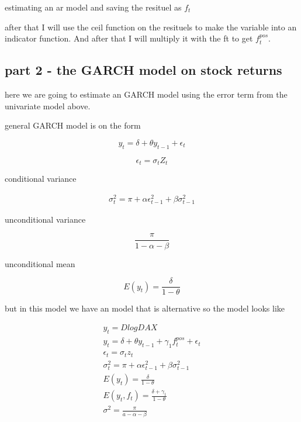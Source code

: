 \documentclass[12pt]{article}
\begin{document}
{estimating an ar model and saving the resituel as $f_t$

after that I will use the ceil function on the resituels to make the variable into an indicator function. And after that I will multiply it with the ft to get $f^{pos}_t$.

\subsection{part 2 - the GARCH model on stock returns}

here we are going to estimate an GARCH model using the error term from the univariate model above. 

general GARCH model is on the form

\begin{equation}
    y_t = \delta + \theta y_{t-1} + \epsilon_t
\end{equation}

\begin{equation}
    \epsilon_t = \sigma_t Z_t
\end{equation}

conditional variance 

\begin{align}
    \sigma_t^2 = \pi + \alpha \epsilon_{t-1}^2 + \beta \sigma_{t-1}^2  
\end{align}

unconditional variance 

\begin{equation}
    \frac{\pi}{1-\alpha -\beta}
\end{equation}

unconditional mean 

\begin{equation}
    E(y_t) = \frac{\delta}{1-\theta}
\end{equation}

but in this model we have an model that is alternative so the model looks like 

\begin{align}
     y_t = DlogDAX \\
     y_t = \delta + \theta y_{t-1} + \gamma_1 f^{pos}_t + \epsilon_t\\
     \epsilon_t = \sigma_t z_t \\
     \sigma^2_t = \pi + \alpha \epsilon^2_{t-1} + \beta \sigma^2_{t-1}\\
     E(y_t) = \frac{\delta}{1-\theta}\\
     E(y_t, f_t) = \frac{\delta + \gamma_1}{1-\theta}\\
     \sigma^2 = \frac{\pi}{a-\alpha - \beta}\\
\end{align}

}
\end{document}

